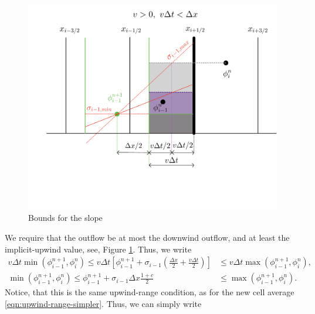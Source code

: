 \documentclass[../thesis.tex]{subfiles}
\begin{document}
\begin{figure}[H]
	\centering
	\includegraphics[width=\textwidth]{Slope-bounds-crop.pdf}
	\caption{Bounds for the slope}
	\label{fig:slope-bounds-implicit-1d}
\end{figure}
We require that the outflow be at most the downwind outflow, and at least the implicit-upwind value, see, Figure \ref{fig:slope-bounds-implicit-1d}. Thus, we write
\begin{equation}\label{eqn: urc-all c-bounded slope}
    \begin{split}
        v\Delta t\min(\phi_{i-1}^{n+1},\phi_{i}^{n})
        \leq
        v\Delta t
        \left[
            \phi_{i-1}^{n+1}
            +\sigma_{i-1}\left(
                \frac{\Delta x}{2} + \frac{v\Delta t}{2}
                \right)
        \right]
        &\leq
        v\Delta t\max(\phi_{i-1}^{n+1},\phi_{i}^{n}),
        \\
        \min(\phi_{i-1}^{n+1},\phi_{i}^{n})
        \leq
        \phi_{i-1}^{n+1}
        +\sigma_{i-1} \Delta x \frac{1+c}{2}
        &\leq
        \max(\phi_{i-1}^{n+1},\phi_{i}^{n}).
    \end{split}
\end{equation}
Notice, that this is the same upwind-range condition, as for the new cell average \eqref{eqn:upwind-range-simpler}. Thus, we can simply  write
\end{document}
